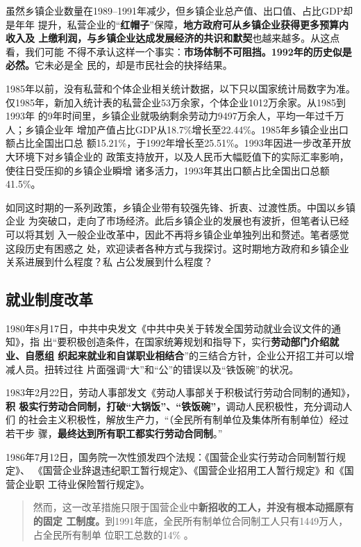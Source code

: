 虽然乡镇企业数量在1989--1991年减少，但乡镇企业总产值、出口值、占比GDP却是年年
提升，私营企业的“\textbf{红帽子}”保障，\textbf{地方政府可从乡镇企业获得更多预算内收入及
  上缴利润，与乡镇企业达成发展经济的共识和默契}也越来越多。从这点看，我们可能
不得不承认这样一个事实：\textbf{市场体制不可阻挡。1992年的历史似是必然。}它未必是全
民的，却是市民社会的抉择结果。

1985年以前，没有私营和个体企业相关统计数据，以下只以国家统计局数字为准。
仅1985年，新加入统计表的私营企业53万余家，个体企业1012万余家。从1985到1993年
的9年时间里，乡镇企业就吸纳剩余劳动力9497万余人，平均一年过千万人；乡镇企业年
增加产值占比GDP从18.7\%增长至22.44\%。1985年乡镇企业出口额占比全国出口总
额15.21\%，于1992年增长至25.51\%。1993年因进一步改革开放大环境下对乡镇企业的
政策支持放开，以及人民币大幅贬值下的实际汇率影响，使往日受压抑的乡镇企业瞬增
诸多活力，1993年其出口额占比全国出口总额41.5\%。

如同这时期的一系列政策，乡镇企业带有较强先锋、折衷、过渡性质。中国以乡镇企业
为突破口，走向了市场经济。此后乡镇企业的发展也有波折，但笔者认已经可以将其划
入一般企业改革中，因此不再将乡镇企业单独列出和赘述。笔者感觉这段历史有困惑之
处，欢迎读者各种方式与我探讨。这时期地方政府和乡镇企业关系进展到什么程度？私
占公发展到什么程度？

\subsection{就业制度改革}

1980年8月17日，中共中央发文《中共中央关于转发全国劳动就业会议文件的通知》，指
出“要积极创造条件，在国家统筹规划和指导下，实行\textbf{劳动部门介绍就业、自愿组
  织起来就业和自谋职业相结合}”的三结合方针，企业公开招工并可以增减人员。扭转过往
片面强调“大”和“公”的错误以及“铁饭碗”的状况。

1983年2月22日，劳动人事部发文《劳动人事部关于积极试行劳动合同制的通知》，\textbf{积
  极实行劳动合同制，打破“大锅饭”、“铁饭碗”，}调动人民积极性，充分调动人们
的社会主义积极性，解放生产力，“（全民所有制单位及集体所有制单位）经过若干步
骤，\textbf{最终达到所有职工都实行劳动合同制}。”

1986年7月12日，国务院一次性颁发四个法规：《国营企业实行劳动合同制暂行规定》、
《国营企业辞退违纪职工暂行规定》、《国营企业招用工人暂行规定》和《国营企业职
工待业保险暂行规定》。
\begin{quotation}
  然而，这一改革措施只限于国营企业中\textbf{新招收的工人，并没有根本动摇原有的固定
    工制度。}到1991年底，全民所有制单位合同制工人只有1449万人，占全民所有制单
  位职工总数的14\% 。\cite{laodongzhiduyuanfang}
\end{quotation}

